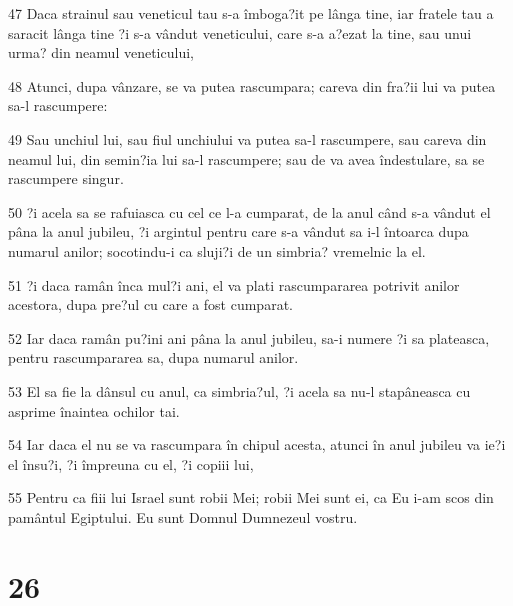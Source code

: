 \par 47 Daca strainul sau veneticul tau s-a îmboga?it pe lânga tine, iar fratele tau a saracit lânga tine ?i s-a vândut veneticului, care s-a a?ezat la tine, sau unui urma? din neamul veneticului,
\par 48 Atunci, dupa vânzare, se va putea rascumpara; careva din fra?ii lui va putea sa-l rascumpere:
\par 49 Sau unchiul lui, sau fiul unchiului va putea sa-l rascumpere, sau careva din neamul lui, din semin?ia lui sa-l rascumpere; sau de va avea îndestulare, sa se rascumpere singur.
\par 50 ?i acela sa se rafuiasca cu cel ce l-a cumparat, de la anul când s-a vândut el pâna la anul jubileu, ?i argintul pentru care s-a vândut sa i-l întoarca dupa numarul anilor; socotindu-i ca sluji?i de un simbria? vremelnic la el.
\par 51 ?i daca ramân înca mul?i ani, el va plati rascumpararea potrivit anilor acestora, dupa pre?ul cu care a fost cumparat.
\par 52 Iar daca ramân pu?ini ani pâna la anul jubileu, sa-i numere ?i sa plateasca, pentru rascumpararea sa, dupa numarul anilor.
\par 53 El sa fie la dânsul cu anul, ca simbria?ul, ?i acela sa nu-l stapâneasca cu asprime înaintea ochilor tai.
\par 54 Iar daca el nu se va rascumpara în chipul acesta, atunci în anul jubileu va ie?i el însu?i, ?i împreuna cu el, ?i copiii lui,
\par 55 Pentru ca fiii lui Israel sunt robii Mei; robii Mei sunt ei, ca Eu i-am scos din pamântul Egiptului. Eu sunt Domnul Dumnezeul vostru.

\chapter{26}

